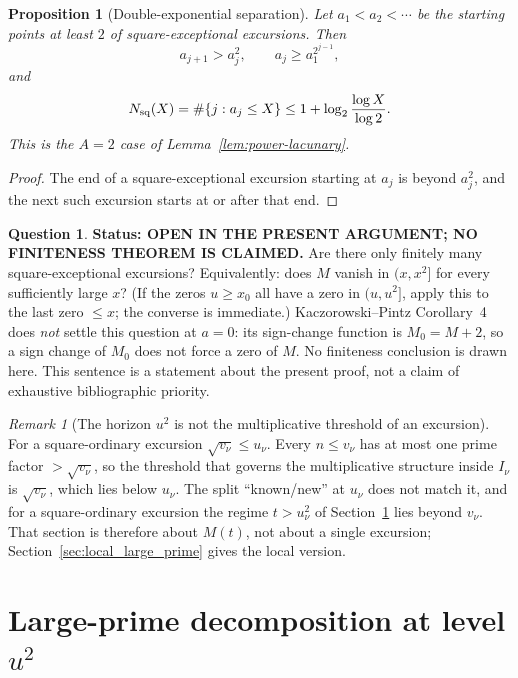 \documentclass[11pt]{amsart}
\numberwithin{equation}{section}
\theoremstyle{plain}
\newtheorem{proposition}[theorem]{Proposition}
\theoremstyle{definition}
\newtheorem{question}[theorem]{Question}
\theoremstyle{remark}
\newtheorem{remark}[theorem]{Remark}
\begin{document}
\begin{proposition}[Double-exponential separation]
\label{prop:double-exp}
Let $a_1<a_2<\cdots$ be the starting points at least $2$ of
square-exceptional excursions. Then
\[
a_{j+1}>a_j^2,\qquad a_j\ge a_1^{2^{j-1}},
\]
and
\[
N_{\rm sq}(X)=\#\{j:a_j\le X\}
\le1+\log_2\frac{\log X}{\log2}.
\]
This is the $A=2$ case of Lemma~\ref{lem:power-lacunary}.
\end{proposition}

\begin{proof}
The end of a square-exceptional excursion starting at $a_j$ is beyond
$a_j^2$, and the next such excursion starts at or after that end.
\end{proof}

\begin{question}
\label{q:finiteness_expanding}
\textbf{Status: OPEN IN THE PRESENT ARGUMENT; NO FINITENESS THEOREM IS CLAIMED.}
Are there only finitely many square-exceptional excursions?
Equivalently: does $M$ vanish in $(x,x^2]$ for every sufficiently large $x$?
(If the zeros $u\ge x_0$ all have a zero in $(u,u^2]$, apply this to the
last zero $\le x$; the converse is immediate.) Kaczorowski--Pintz Corollary~4 does \emph{not} settle this question at
$a=0$: its sign-change function is $M_0=M+2$, so a sign change of $M_0$
does not force a zero of $M$. No finiteness conclusion is drawn here. This
sentence is a statement about the present proof, not a claim of exhaustive
bibliographic priority.
\end{question}

\begin{remark}[The horizon $u^2$ is not the multiplicative threshold of an excursion]
\label{rem:horizon_inactive}
For a square-ordinary excursion $\sqrt{v_\nu}\le u_\nu$. Every $n\le v_\nu$
has at most one prime factor $>\sqrt{v_\nu}$, so the threshold that governs
the multiplicative structure inside $I_\nu$ is $\sqrt{v_\nu}$, which lies
below $u_\nu$. The split ``known/new'' at $u_\nu$ does not match it, and for
a square-ordinary excursion the regime $t>u_\nu^2$ of
Section~\ref{sec:prime_copy_propagation} lies beyond $v_\nu$. That section
is therefore about $M(t)$, not about a single excursion;
Section~\ref{sec:local_large_prime} gives the local version.
\end{remark}

\section{Large-prime decomposition at level \texorpdfstring{$u^2$}{u^2}}
\label{sec:prime_copy_propagation}
\end{document}
